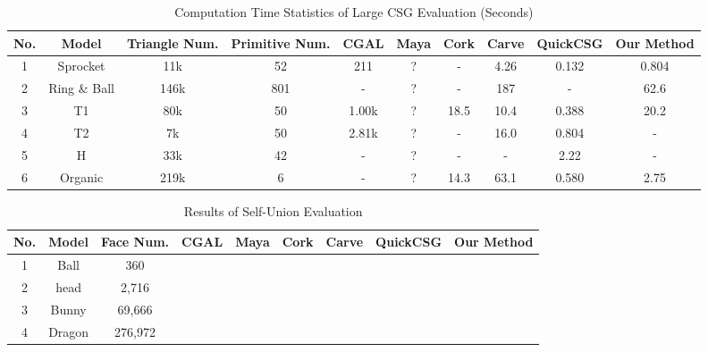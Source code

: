 \documentclass[10pt,journal,compsoc]{IEEEtran}
\newcommand{\cmark}{\ding{51}}%
\newcommand{\xmark}{\ding{55}}%
\begin{document}
\begin{table}[ht]
\caption{Computation Time Statistics of Large CSG Evaluation (Seconds)}
\label{tab:performance2}
\centering
\begin{tabular}{*{9}{c|}c}%
\hline
{No.} & {Model} & {Triangle Num.} & {Primitive Num.} &
CGAL & Maya & Cork & Carve & QuickCSG & Our Method
\\
\hline\hline
1 & Sprocket & 11k & 52 & 211 & ? & - & 4.26 & 0.132 & 0.804\\
2 & Ring \& Ball & 146k & 801 & - & ? & - & 187 & - & 62.6\\
3 & T1 & 80k & 50 & 1.00k & ? & 18.5 & 10.4 & 0.388 & 20.2\\
4 & T2 & 7k & 50 & 2.81k & ? & - & 16.0 & 0.804 & -\\
5 & H & 33k & 42 & - & ? & - & - & 2.22 & -\\
6 & Organic & 219k & 6 & - & ? & 14.3 & 63.1 & 0.580 & 2.75\\
\hline
\end{tabular}
\begin{flushleft}
\end{flushleft}
\end{table}

\begin{table}[ht]
\caption{Results of Self-Union Evaluation}
\label{tab:selfunion}
\centering
\begin{tabular}{*{8}{c|}c}%
\hline
{No.} & {Model} & {Face Num.} &
CGAL & Maya & Cork & Carve & QuickCSG  & Our Method
\\
\hline\hline
1 & Ball & 360  & \cmark & \cmark & \xmark & \cmark & \xmark & \cmark \\
2 & head & 2,716& \cmark & \cmark & \xmark & \cmark & \xmark  & \cmark\\
3 & Bunny & 69,666  & \xmark & \cmark & \xmark & \cmark & \xmark  & \cmark\\
4 & Dragon & 276,972 & \xmark & \xmark & \xmark & \xmark & \xmark  & \cmark \\
\hline
\end{tabular}
\begin{flushleft}
\end{flushleft}
\end{table}
\end{document}
